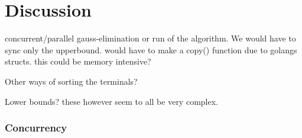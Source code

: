 {
\abnormalparskip{0pt}
\chapter{Discussion}
\label{cha:discussion}
}

concurrent/parallel gauss-elimination or run of the algorithm. We would have to
sync only the upperbound. would have to make a copy() function due to golangs
structs. this could be memory intensive?

Other ways of sorting the terminals?

Lower bounds? these however seem to all be very complex.

\subsection{Concurrency}
\label{sec:concurrency}



